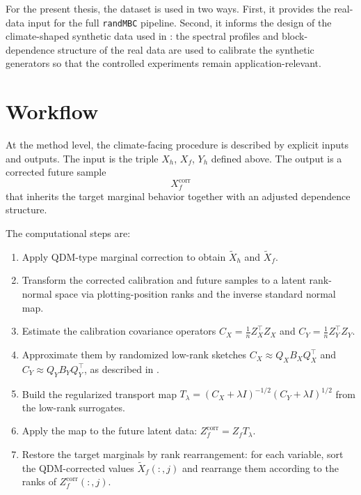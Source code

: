 For the present thesis, the dataset is used in two ways. First, it provides the
real-data input for the full \texttt{randMBC} pipeline. Second, it informs the design
of the climate-shaped synthetic data used in : the spectral
profiles and block-dependence structure of the real data are used to calibrate the
synthetic generators so that the controlled experiments remain application-relevant.


\section{Workflow}

At the method level, the climate-facing procedure is described by explicit inputs
and outputs. The input is the triple \(X_h\), \(X_f\), \(Y_h\) defined above. The
output is a corrected future sample
\[
	X_f^{\mathrm{corr}}
\]
that inherits the target marginal behavior together with an adjusted dependence
structure.

The computational steps are:
\begin{enumerate}
	\item Apply QDM-type marginal correction to obtain \(\widetilde X_h\) and
	      \(\widetilde X_f\).
	\item Transform the corrected calibration and future samples to a latent
	      rank-normal space via plotting-position ranks and the inverse standard
	      normal map.
	\item Estimate the calibration covariance operators
	      \(C_X = \frac{1}{n} Z_X^\top Z_X\) and
	      \(C_Y = \frac{1}{n} Z_Y^\top Z_Y\).
	\item Approximate them by randomized low-rank sketches
	      \(C_X \approx Q_X B_X Q_X^\top\) and
	      \(C_Y \approx Q_Y B_Y Q_Y^\top\),
	      as described in .
	\item Build the regularized transport map
	      \(T_\lambda = (C_X + \lambda I)^{-1/2}(C_Y + \lambda I)^{1/2}\)
	      from the low-rank surrogates.
	\item Apply the map to the future latent data:
	      \(Z_f^{\mathrm{corr}} = Z_f T_\lambda\).
	\item Restore the target marginals by rank rearrangement: for each variable,
	      sort the QDM-corrected values \(\widetilde X_f(:,j)\) and rearrange
	      them according to the ranks of \(Z_f^{\mathrm{corr}}(:,j)\).
\end{enumerate}

